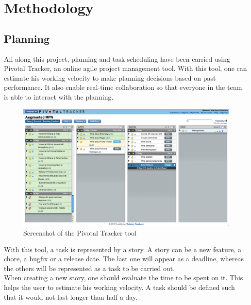 \chapter{Methodology}
\label{cha:methodology}

\section{Planning}

All along this project, planning and task scheduling have been carried using Pivotal Tracker, an online agile project management tool. With this tool, one can estimate his working velocity to make planning decisions based on past performance. It also enable real-time collaboration so that everyone in the team is able to interact with the planning.\\

\begin{figure}[ht]
\center
\includegraphics[scale=0.3]{pics/pivotal_tracker}
\caption{Screenshot of the Pivotal Tracker tool}
\label{fig:pivotal_tracker}
\end{figure}

With this tool, a task is represented by a story. A story can be a new feature, a chore, a bugfix or a release date. The last one will appear as a deadline, whereas the others will be represented as a task to be carried out.\\

When creating a new story, one should evaluate the time to be spent on it. This helps the user to estimate his working velocity. A task should be defined such that it would not last longer than half a day.\\

